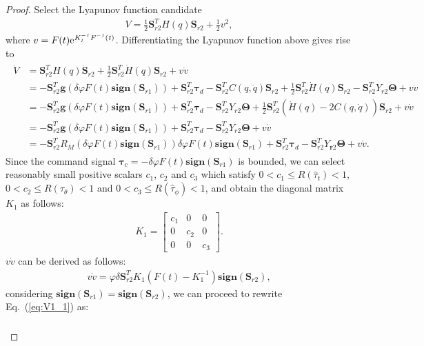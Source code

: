 \documentclass[3p]{elsarticle}
\theoremstyle{plain}
\theoremstyle{remark}
\begin{document}
\begin{proof}
Select the Lyapunov function candidate
\begin{align}
V=\frac{1}{2}\bm S_{r2}^TH(q)\bm S_{r2}+\frac{1}{2}v^2,
\end{align}
where $v=F(t)\rm{e}\it{^{K_1^{-1}F^{-1}(t)}}$. Differentiating the Lyapunov function above gives rise to
\begin{align}
\begin{split}
\dot V &= \bm S_{r2}^TH(q)\dot {\bm S}_{r2}+\frac{1}{2}\bm S_{r2}^T\dot H(q)\bm S_{r2}+v\dot v\\
&= -\bm S_{r2}^T\bm{g}(\delta\varphi F(t) \mathbf{sign}(\bm S_{r1}))+\bm S_{r2}^T\bm\tau_d-\bm S_{r2}^TC(q,\dot q)\bm S_{r2}+\frac{1}{2}\bm S_{r2}^T\dot H(q)\bm S_{r2}-\bm S_{r2}^TY_{r2}\bm\Theta+v\dot v\\
&= -\bm S_{r2}^T\bm{g}(\delta\varphi F(t) \mathbf{sign}(\bm S_{r1}))+\bm S_{r2}^T\bm\tau_d-\bm S_{r2}^TY_{r2}\bm\Theta+\frac{1}{2}\bm S_{r2}^T(\dot H(q)-2C(q,\dot q))\bm S_{r2}+v\dot v\\
&= -\bm S_{r2}^T\bm{g}(\delta\varphi F(t) \mathbf{sign}(\bm S_{r1}))+\bm S_{r2}^T\bm\tau_d-\bm S_{r2}^TY_{r2}\bm\Theta+v\dot v\\
&= -\bm S_{r2}^TR_M(\delta\varphi F(t) \mathbf{sign}(\bm S_{r1}))\delta\varphi F(t) \mathbf{sign}(\bm S_{r1})+\bm S_{r2}^T\bm\tau_d-\bm S_{r2}^TY_{\bm r2}\bm\Theta+v\dot v.\label{eq:V1_1}
\end{split}
\end{align}
Since the command signal $ \bm\tau_c=-\delta\varphi F(t) \mathbf {sign}(\bm{S}_{r1})$ is bounded, we can select reasonably small positive scalars $c_1$, $c_2$ and $c_3$ which satisfy $0<c_1\le R(\hat\tau_t)<1$, $0<c_2\le R(\hat\tau_\theta)<1$ and $0<c_3\le R(\hat\tau_\phi)<1$, and obtain the diagonal matrix $K_1$ as follows:
\begin{align}
K_1 = \begin{bmatrix}c_1&0&0\\0&c_2&0\\0&0&c_3\end{bmatrix}.\label{eq:saturated ratio}
\end{align}
$v\dot v$ can be derived as follows:
\begin{align}
v\dot v =\varphi\delta \bm S_{r2}^T K_1(F(t)-K_1^{-1})\mathbf{sign}(\bm S_{r2}),
\end{align}
considering $\mathbf{sign}(\bm S_{r1})=\mathbf{sign}(\bm S_{r2})$, we can proceed to rewrite Eq.~(\ref{eq:V1_1}) as:
\begin{align}
\begin{split}\label{eq:V1_2}

\end{split}
\end{align}
\end{proof}
\end{document}

